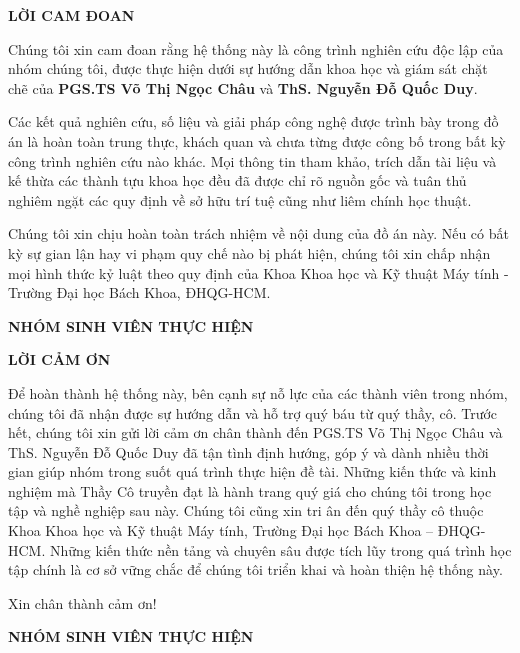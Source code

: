 \documentclass[12pt,a4paper]{article}
\theoremstyle{definition}
\begin{document}


\newpage
\pagestyle{fancy}
\begin{center}
    \textbf{\Large LỜI CAM ĐOAN}
\end{center}
Chúng tôi xin cam đoan rằng hệ thống này là công trình nghiên cứu độc lập của nhóm chúng tôi, được thực hiện dưới sự hướng dẫn khoa học và giám sát chặt chẽ của \textbf{PGS.TS Võ Thị Ngọc Châu} và \textbf{ThS. Nguyễn Đỗ Quốc Duy}.

Các kết quả nghiên cứu, số liệu và giải pháp công nghệ được trình bày trong đồ án là hoàn toàn trung thực, khách quan và chưa từng được công bố trong bất kỳ công trình nghiên cứu nào khác. Mọi thông tin tham khảo, trích dẫn tài liệu và kế thừa các thành tựu khoa học đều đã được chỉ rõ nguồn gốc và tuân thủ nghiêm ngặt các quy định về sở hữu trí tuệ cũng như liêm chính học thuật.

Chúng tôi xin chịu hoàn toàn trách nhiệm về nội dung của đồ án này. Nếu có bất kỳ sự gian lận hay vi phạm quy chế nào bị phát hiện, chúng tôi xin chấp nhận mọi hình thức kỷ luật theo quy định của Khoa Khoa học và Kỹ thuật Máy tính - Trường Đại học Bách Khoa, ĐHQG-HCM.
\vspace{2cm}

\begin{flushright}
    \textbf{NHÓM SINH VIÊN THỰC HIỆN} \\[2.5cm] 
\end{flushright}
\newpage

\begin{center}
    \textbf{\Large LỜI CẢM ƠN}
\end{center}

Để hoàn thành hệ thống này, bên cạnh sự nỗ lực của các thành viên trong nhóm, chúng tôi đã nhận được sự hướng dẫn và hỗ trợ quý báu từ quý thầy, cô.
Trước hết, chúng tôi xin gửi lời cảm ơn chân thành đến PGS.TS Võ Thị Ngọc Châu và ThS. Nguyễn Đỗ Quốc Duy đã tận tình định hướng, góp ý và dành nhiều thời gian giúp nhóm trong suốt quá trình thực hiện đề tài. Những kiến thức và kinh nghiệm mà Thầy Cô truyền đạt là hành trang quý giá cho chúng tôi trong học tập và nghề nghiệp sau này.
Chúng tôi cũng xin tri ân đến quý thầy cô thuộc Khoa Khoa học và Kỹ thuật Máy tính, Trường Đại học Bách Khoa – ĐHQG-HCM. Những kiến thức nền tảng và chuyên sâu được tích lũy trong quá trình học tập chính là cơ sở vững chắc để chúng tôi triển khai và hoàn thiện hệ thống này.

Xin chân thành cảm ơn!
\vspace{1.5cm}
\begin{flushright}
    \textbf{NHÓM SINH VIÊN THỰC HIỆN}
\end{flushright}
\newpage
\end{document}
